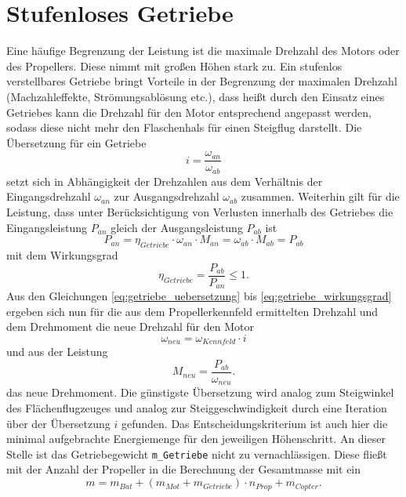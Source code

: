 \section{Stufenloses Getriebe}
\label{sec:getriebe}
Eine häufige Begrenzung der Leistung ist die maximale Drehzahl des Motors oder des Propellers. Diese nimmt mit großen Höhen stark zu. Ein stufenlos verstellbares Getriebe bringt Vorteile in der Begrenzung der maximalen Drehzahl (Machzahleffekte, Strömungsablösung etc.), dass heißt durch den Einsatz eines Getriebes kann die Drehzahl für den Motor entsprechend angepasst werden, sodass diese nicht mehr den Flaschenhals für einen Steigflug darstellt.
Die Übersetzung für ein Getriebe 
\begin{equation}
	i = \frac{\omega_{an}}{\omega_{ab}} 
	\label{eq:getriebe_uebersetzung}
\end{equation}
setzt sich in Abhängigkeit der Drehzahlen aus dem Verhältnis der Eingangsdrehzahl \ensuremath{\omega_{an}} zur Ausgangsdrehzahl \ensuremath{\omega_{ab}} zusammen. Weiterhin gilt für die Leistung, dass unter Berücksichtigung von Verlusten innerhalb des Getriebes die Eingangsleistung \ensuremath{P_{an}} gleich der Ausgangsleistung \ensuremath{P_{ab}} ist
\begin{equation}
	P_{an} = \eta_{Getriebe} \cdot \omega_{an}\cdot M_{an} = \omega_{ab}\cdot M_{ab} = P_{ab}
	\label{eq:getriebe_leistung}
\end{equation} 
mit dem Wirkungsgrad 
\begin{equation}
	\eta_{Getriebe} = \frac{P_{ab}}{P_{an}} \leq 1.
	\label{eq:getriebe_wirkungsgrad}
\end{equation}
Aus den Gleichungen \ref{eq:getriebe_uebersetzung} bis \ref{eq:getriebe_wirkungsgrad} ergeben sich nun für die aus dem Propellerkennfeld ermittelten Drehzahl und dem Drehmoment die neue Drehzahl für den Motor
\begin{equation}
	\omega_{neu} = \omega_{Kennfeld}\cdot i
\end{equation}
und aus der Leistung
\begin{equation}
	M_{neu} = \frac{P_{ab}}{\omega_{neu}}.
\end{equation}
das neue Drehmoment.
Die günstigste Übersetzung wird analog zum Steigwinkel des Flächenflugzeuges und analog zur Steiggeschwindigkeit durch eine Iteration über der Übersetzung \ensuremath{i} gefunden. Das Entscheidungskriterium ist auch hier die minimal aufgebrachte Energiemenge für den jeweiligen Höhenschritt. An dieser Stelle ist das Getriebegewicht \texttt{m\_Getriebe} nicht zu vernachlässigen. Diese fließt mit der Anzahl der Propeller in die Berechnung der Gesamtmasse mit ein
\begin{equation}
	m = m_{Bat} + (m_{Mot} + m_{Getriebe})\cdot n_{Prop} + m_{Copter} .
\end{equation}


